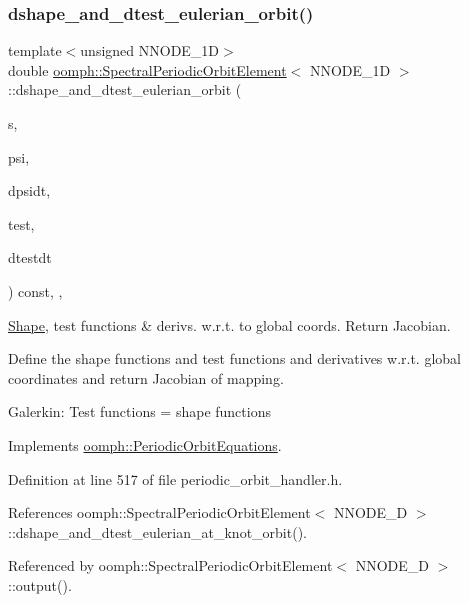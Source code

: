 \subsubsection{\texorpdfstring{dshape\+\_\+and\+\_\+dtest\+\_\+eulerian\+\_\+orbit()}{dshape\_and\_dtest\_eulerian\_orbit()}}
{\footnotesize\ttfamily template$<$unsigned N\+N\+O\+D\+E\+\_\+1D$>$ \\
double \hyperlink{classoomph_1_1SpectralPeriodicOrbitElement}{oomph\+::\+Spectral\+Periodic\+Orbit\+Element}$<$ N\+N\+O\+D\+E\+\_\+1D $>$\+::dshape\+\_\+and\+\_\+dtest\+\_\+eulerian\+\_\+orbit (\begin{DoxyParamCaption}\item[{const \hyperlink{classoomph_1_1Vector}{Vector}$<$ double $>$ \&}]{s,  }\item[{\hyperlink{classoomph_1_1Shape}{Shape} \&}]{psi,  }\item[{\hyperlink{classoomph_1_1DShape}{D\+Shape} \&}]{dpsidt,  }\item[{\hyperlink{classoomph_1_1Shape}{Shape} \&}]{test,  }\item[{\hyperlink{classoomph_1_1DShape}{D\+Shape} \&}]{dtestdt }\end{DoxyParamCaption}) const\hspace{0.3cm}{\ttfamily [inline]}, {\ttfamily [protected]}, {\ttfamily [virtual]}}



\hyperlink{classoomph_1_1Shape}{Shape}, test functions \& derivs. w.\+r.\+t. to global coords. Return Jacobian. 

Define the shape functions and test functions and derivatives w.\+r.\+t. global coordinates and return Jacobian of mapping.

Galerkin\+: Test functions = shape functions 

Implements \hyperlink{classoomph_1_1PeriodicOrbitEquations_a745c25bf4dc333322bc9b4c1841ec11e}{oomph\+::\+Periodic\+Orbit\+Equations}.



Definition at line 517 of file periodic\+\_\+orbit\+\_\+handler.\+h.



References oomph\+::\+Spectral\+Periodic\+Orbit\+Element$<$ N\+N\+O\+D\+E\+\_\+D $>$\+::dshape\+\_\+and\+\_\+dtest\+\_\+eulerian\+\_\+at\+\_\+knot\+\_\+orbit().



Referenced by oomph\+::\+Spectral\+Periodic\+Orbit\+Element$<$ N\+N\+O\+D\+E\+\_\+D $>$\+::output().

